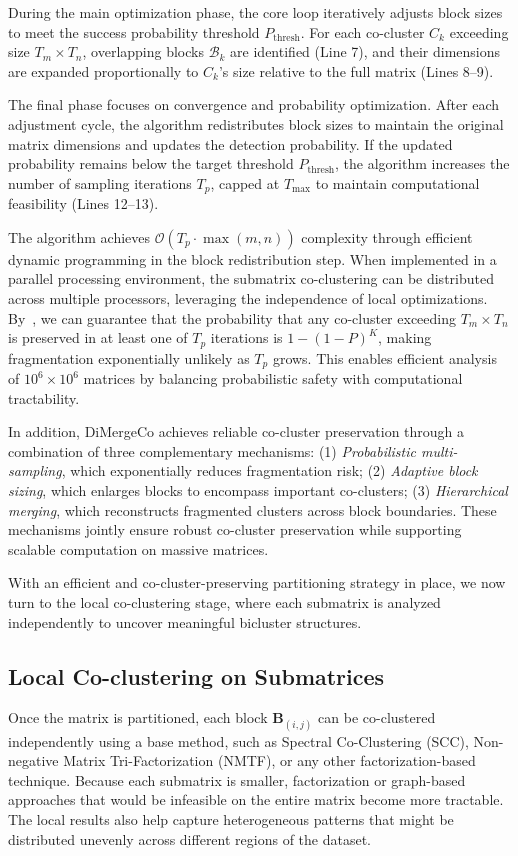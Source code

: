 \documentclass[journal]{IEEEtran}
\begin{document}
During the main optimization phase, the core loop iteratively adjusts block sizes to meet the success probability threshold $P_{\text{thresh}}$. For each co-cluster $C_k$ exceeding size $T_m \times T_n$, overlapping blocks $\mathcal{B}_k$ are identified (Line 7), and their dimensions are expanded proportionally to $C_k$'s size relative to the full matrix (Lines 8--9).

The final phase focuses on convergence and probability optimization. After each adjustment cycle, the algorithm redistributes block sizes to maintain the original matrix dimensions and updates the detection probability. If the updated probability remains below the target threshold $P_{\text{thresh}}$, the algorithm increases the number of sampling iterations $T_p$, capped at $T_{\text{max}}$ to maintain computational feasibility (Lines 12--13).

The algorithm achieves $\mathcal{O}(T_p \cdot \max(m,n))$ complexity through efficient dynamic programming in the block redistribution step. When implemented in a parallel processing environment, the submatrix co-clustering can be distributed across multiple processors, leveraging the independence of local optimizations.
By~, we can guarantee that the probability that any co-cluster exceeding $T_m \times T_n$ is preserved in at least one of $T_p$ iterations is $1 - (1 - P)^K$, making fragmentation exponentially unlikely as $T_p$ grows. This enables efficient analysis of $10^6 \times 10^6$ matrices by balancing probabilistic safety with computational tractability.

    {\color{blue}
        In addition, DiMergeCo achieves reliable co-cluster preservation through a combination of three complementary mechanisms:
        (1) \emph{Probabilistic multi-sampling}, which exponentially reduces fragmentation risk;
        (2) \emph{Adaptive block sizing}, which enlarges blocks to encompass important co-clusters;
        (3) \emph{Hierarchical merging}, which reconstructs fragmented clusters across block boundaries.
        These mechanisms jointly ensure robust co-cluster preservation while supporting scalable computation on massive matrices.
    }

With an efficient and co-cluster-preserving partitioning strategy in place, we now turn to the local co-clustering stage, where each submatrix is analyzed independently to uncover meaningful bicluster structures.

\subsection{Local Co-clustering on Submatrices}
\label{subsec:local-co-clustering}
Once the matrix is partitioned, each block $\mathbf{B}_{(i,j)}$ can be co-clustered independently using a base method, such as Spectral Co-Clustering (SCC), Non-negative Matrix Tri-Factorization (NMTF), or any other factorization-based technique. Because each submatrix is smaller, factorization or graph-based approaches that would be infeasible on the entire matrix become more tractable. The local results also help capture heterogeneous patterns that might be distributed unevenly across different regions of the dataset.
\end{document}
